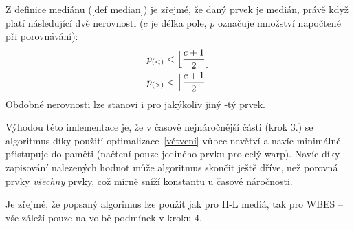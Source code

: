     Z definice mediánu (\ref{def median}) je zřejmé, že daný prvek je medián, právě když platí následující dvě nerovnosti ($c$ je délka pole, $p$ označuje množství napočtené při porovnávání):
    \begin{align}
      p_{(<)} < \Big\lfloor\frac{c+1}{2}\Big\rfloor \notag \\
      p_{(>)} < \Big\lceil\frac{c+1}{2}\Big\rceil \notag
    \end{align}
    Obdobné nerovnosti lze stanovi i pro jakýkoliv jiný \kk-tý prvek.
    
    Výhodou této imlementace je, že v časově nejnáročnější části (krok 3.) se algoritmus díky použití optimalizace~\ref{větvení} vůbec nevětví a navíc minimálně přistupuje do paměti (načtení pouze jediného prvku pro celý warp). Navíc díky zapisování nalezených hodnot může algoritmus skončit ještě dříve, než porovná prvky \emph{všechny} prvky, což mírně sníží konstantu u časové náročnosti. 
    
    Je zřejmé, že popsaný algorimus lze použít jak pro H-L mediá, tak pro WBES -- vše záleží pouze na volbě podmínek v kroku 4.
    

